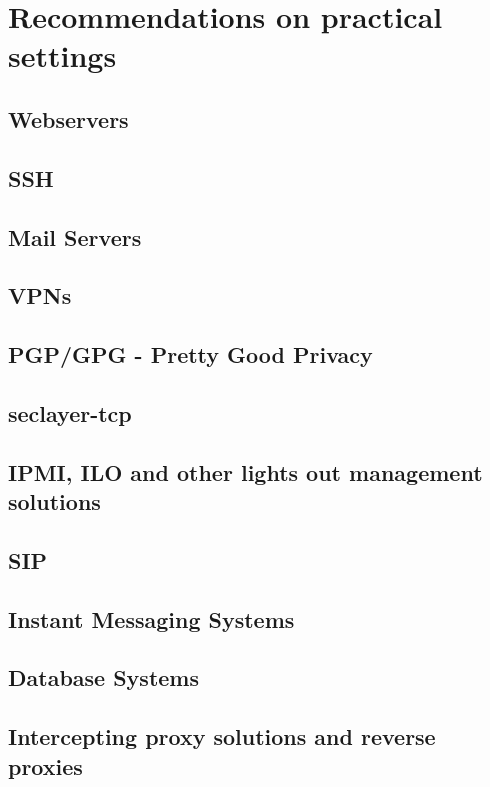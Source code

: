 \newpage
\section{Recommendations on practical settings}
\label{section:PracticalSettings}


\subsection{Webservers}


\subsection{SSH}


\subsection{Mail Servers}



\subsection{VPNs}



\subsection{PGP/GPG - Pretty Good Privacy}



\subsection{seclayer-tcp}



\subsection{IPMI, ILO and other lights out management solutions}



\subsection{SIP}


\subsection{Instant Messaging Systems}



\subsection{Database Systems}



\subsection{Intercepting proxy solutions and reverse proxies}
 



